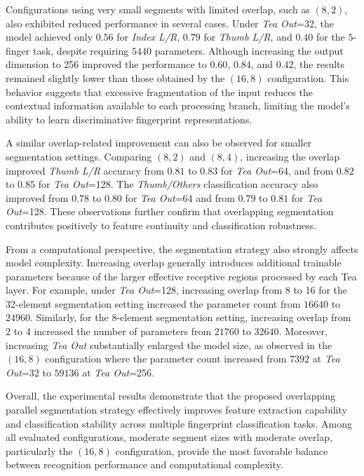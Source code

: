 \documentclass[../main.tex]{subfiles}
\begin{document}
Configurations using very small segments with limited overlap, such as $(8,2)$, also exhibited reduced performance in several cases. Under \textit{Tea Out}=32, the model achieved only $0.56$ for \textit{Index L/R}, $0.79$ for \textit{Thumb L/R}, and $0.40$ for the $5$-finger task, despite requiring $5440$ parameters. Although increasing the output dimension to 256 improved the performance to $0.60$, $0.84$, and $0.42$, the results remained slightly lower than those obtained by the $(16,8)$ configuration. This behavior suggests that excessive fragmentation of the input reduces the contextual information available to each processing branch, limiting the model’s ability to learn discriminative fingerprint representations.

A similar overlap-related improvement can also be observed for smaller segmentation settings. Comparing $(8,2)$ and $(8,4)$, increasing the overlap improved \textit{Thumb L/R} accuracy from $0.81$ to $0.83$ for \textit{Tea Out}=64, and from $0.82$ to $0.85$ for \textit{Tea Out}=128. The \textit{Thumb/Others} classification accuracy also improved from $0.78$ to $0.80$ for \textit{Tea Out}=64 and from $0.79$ to $0.81$ for \textit{Tea Out}=128. These observations further confirm that overlapping segmentation contributes positively to feature continuity and classification robustness.

From a computational perspective, the segmentation strategy also strongly affects model complexity. Increasing overlap generally introduces additional trainable parameters because of the larger effective receptive regions processed by each Tea layer. For example, under \textit{Tea Out}=128, increasing overlap from 8 to 16 for the 32-element segmentation setting increased the parameter count from $16640$ to $24960$. Similarly, for the 8-element segmentation setting, increasing overlap from 2 to 4 increased the number of parameters from $21760$ to $32640$. Moreover, increasing \textit{Tea Out} substantially enlarged the model size, as observed in the $(16,8)$ configuration where the parameter count increased from $7392$ at \textit{Tea Out}=32 to $59136$ at \textit{Tea Out}=256.

Overall, the experimental results demonstrate that the proposed overlapping parallel segmentation strategy effectively improves feature extraction capability and classification stability across multiple fingerprint classification tasks. Among all evaluated configurations, moderate segment sizes with moderate overlap, particularly the $(16,8)$ configuration, provide the most favorable balance between recognition performance and computational complexity.
\end{document}
